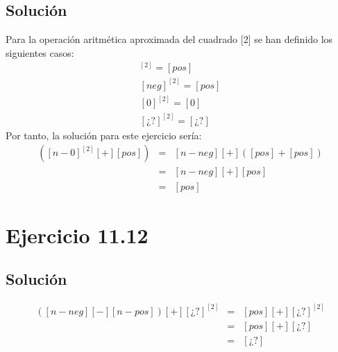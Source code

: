 \documentclass[11pt, a4paper, titlepage]{article}
\begin{document}
\subsection*{Solución}
Para la operación aritmética aproximada del cuadrado [2] se han definido los
siguientes casos:
\newline
\begin{align*}
  [pos]^{[2]} = [pos]\\
  [neg]^{[2]} = [pos]\\
  [0]^{[2]} = [0]\\
  [¿?]^{[2]} = [¿?]
\end{align*}
Por tanto, la solución para este ejercicio sería:
\begin{align*}
  [ns-neg][+]([n-0]^{[2]}[+][pos]) & = & [n-neg][+]([pos]+[pos])
  \\
  & = & [n-neg][+][pos]
  \\
  & = &[pos]
\end{align*}
\section*{Ejercicio 11.12}
\subsection*{Solución}
\begin{align*}
  ([n-neg][−][n-pos])[+][¿?]^{[2]} & = & [pos][+][¿?]^{[2]}
  \\
  & = & [pos][+][¿?]
  \\
  & = & [¿?]
\end{align*}
\end{document}
